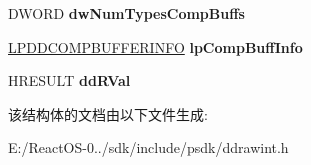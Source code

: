 \begin{DoxyCompactItemize}
D\+W\+O\+RD {\bfseries dw\+Num\+Types\+Comp\+Buffs}
\item 
\mbox{\label{struct___d_d___g_e_t_m_o_c_o_m_p_c_o_m_p_b_u_f_f_d_a_t_a_a8ef4dc818a86751080e3db703b997e83}} 
\hyperlink{struct___d_d_c_o_m_p_b_u_f_f_e_r_i_n_f_o}{L\+P\+D\+D\+C\+O\+M\+P\+B\+U\+F\+F\+E\+R\+I\+N\+FO} {\bfseries lp\+Comp\+Buff\+Info}
\item 
\mbox{\label{struct___d_d___g_e_t_m_o_c_o_m_p_c_o_m_p_b_u_f_f_d_a_t_a_aa90c2b688f0eea58fae1263a0c1975c6}} 
H\+R\+E\+S\+U\+LT {\bfseries dd\+R\+Val}
\end{DoxyCompactItemize}


该结构体的文档由以下文件生成\+:\begin{DoxyCompactItemize}
\item 
E\+:/\+React\+O\+S-\/0../sdk/include/psdk/ddrawint.\+h\end{DoxyCompactItemize}
